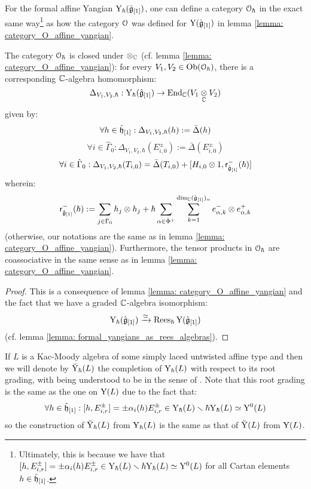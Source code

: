         \begin{lemma} \label{lemma: category_O_formal_affine_yangian}
            For the formal affine Yangian $\mathrm{Y}_{\hbar}(\hat{\mathfrak{g}}_{[1]})$, one can define a category $\mathcal{O}_{\hbar}$ in the exact same way\footnote{Ultimately, this is because we have that $[h, E_{i, r}^{\pm}] = \pm \alpha_i(h) E_{i, r}^{\pm} \in \mathrm{Y}_{\hbar}(L) \smallsetminus \hbar\mathrm{Y}_{\hbar}(L) \simeq \mathrm{Y}^0(L)$ for all Cartan elements $h \in \hat{\mathfrak{h}}_{[1]}$.} as how the category $\mathcal{O}$ was defined for $\mathrm{Y}(\hat{\mathfrak{g}}_{[1]})$ in lemma \ref{lemma: category_O_affine_yangian}. 

            The category $\mathcal{O}_{\hbar}$ is closed under $\tensor_{\bbC}$ (cf. lemma \ref{lemma: category_O_affine_yangian}): for every $V_1, V_2 \in \mathrm{Ob}(\mathcal{O}_{\hbar})$, there is a corresponding $\mathbb{C}$-algebra homomorphism:
                $$\Delta_{V_1, V_2, \hbar}: \rmY_{\hbar}(\hat{\g}_{[1]}) \to \End_{\bbC}(V_1 \tensor_{\bbC} V_2)$$
            given by:
                $$\forall h \in \hat{\mathfrak{h}}_{[1]}: \Delta_{V_1, V_2, \hbar}(h) := \bar{\Delta}(h)$$
                $$\forall i \in \hat{\Gamma}_0: \Delta_{V_1, V_2, \hbar}(E_{i, 0}^{\pm}) := \bar{\Delta}(E_{i, 0}^{\pm})$$
                $$\forall i \in \hat{\Gamma}_0: \Delta_{V_1, V_2, \hbar}(T_{i, 0}) = \bar{\Delta}(T_{i, 0}) + [H_{i, 0} \tensor 1, \sfr_{ \hat{\g}_{[1]} }^-(\hbar)]$$
            wherein:
                $$\sfr_{ \hat{\g}_{[1]} }^-(\hbar) := \sum_{j \in \hat{\Gamma}_0} h_j \tensor h_j + \hbar \sum_{\alpha \in \hat{\Phi}^+} \sum_{k = 1}^{ \dim_{\bbC} (\hat{\g}_{[1]})_{\alpha} } e_{\alpha, k}^- \tensor e_{\alpha, k}^+$$
            (otherwise, our notations are the same as in lemma \ref{lemma: category_O_affine_yangian}). Furthermore, the tensor products in $\mathcal{O}_{\hbar}$ are coassociative in the same sense as in lemma \ref{lemma: category_O_affine_yangian}.
        \end{lemma}
            \begin{proof}
                This is a consequence of lemma \ref{lemma: category_O_affine_yangian} and the fact that we have a graded $\mathbb{C}$-algebra isomorphism:
                    $$\mathrm{Y}_{\hbar}(\hat{\mathfrak{g}}_{[1]}) \xrightarrow[]{\simeq} \operatorname{Rees}_{\hbar} \mathrm{Y}(\hat{\mathfrak{g}}_{[1]})$$
                (cf. lemma \ref{lemma: formal_yangians_as_rees_algebras}).
            \end{proof}
        \begin{convention}
            If $L$ is a Kac-Moody algebra of some simply laced untwisted affine type and then we will denote by $\breve{\mathrm{Y}}_{\hbar}(L)$ the completion of $\mathrm{Y}_{\hbar}(L)$ with respect to its root grading, with  being understood to be in the sense of \cite[Appendix A]{wendlandt_formal_shift_operators_on_yangian_doubles}. Note that this root grading is the same as the one on $\mathrm{Y}(L)$ due to the fact that:
                $$\forall h \in \hat{\mathfrak{h}}_{[1]}: [h, E_{i, r}^{\pm}] = \pm \alpha_i(h) E_{i, r}^{\pm} \in \mathrm{Y}_{\hbar}(L) \smallsetminus \hbar\mathrm{Y}_{\hbar}(L) \simeq \mathrm{Y}^0(L)$$
            so the construction of $\breve{\mathrm{Y}}_{\hbar}(L)$ from $\mathrm{Y}_{\hbar}(L)$ is the same as that of $\breve{\mathrm{Y}}(L)$ from $\mathrm{Y}(L)$.
        \end{convention}
